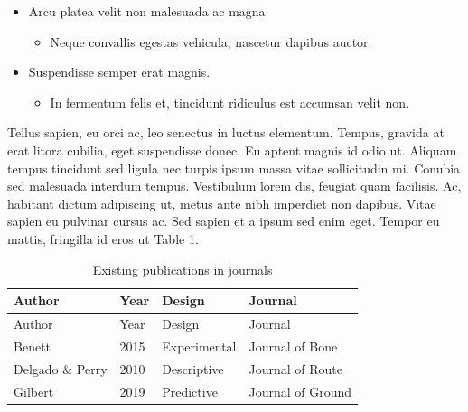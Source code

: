 \documentclass[
  12,
]{article}
\providecommand{\tightlist}{%
  \setlength{\itemsep}{0pt}\setlength{\parskip}{0pt}}
\begin{document}
\begin{itemize}
\tightlist
\item
  Arcu platea velit non malesuada ac magna.

  \begin{itemize}
  \tightlist
  \item
    Neque convallis egestas vehicula, nascetur dapibus auctor.\\
  \end{itemize}
\item
  Suspendisse semper erat magnis.

  \begin{itemize}
  \tightlist
  \item
    In fermentum felis et, tincidunt ridiculus est accumsan velit non.
  \end{itemize}
\end{itemize}

Tellus sapien, eu orci ac, leo senectus in luctus elementum. Tempus,
gravida at erat litora cubilia, eget suspendisse donec. Eu aptent magnis
id odio ut. Aliquam tempus tincidunt sed ligula nec turpis ipsum massa
vitae sollicitudin mi. Conubia sed malesuada interdum tempus. Vestibulum
lorem dis, feugiat quam facilisis. Ac, habitant dictum adipiscing ut,
metus ante nibh imperdiet non dapibus. Vitae sapien eu pulvinar cursus
ac. Sed sapien et a ipsum sed enim eget. Tempor eu mattis, fringilla id
eros ut Table 1.

\begin{longtable}[]{@{}llll@{}}
\caption{Existing publications in journals
\label{markdown_table}}\tabularnewline
\toprule()
Author & Year & Design & Journal \\
\midrule()
\endfirsthead
\toprule()
Author & Year & Design & Journal \\
\midrule()
\endhead
Benett & 2015 & Experimental & Journal of Bone \\
Delgado \& Perry & 2010 & Descriptive & Journal of Route \\
Gilbert & 2019 & Predictive & Journal of Ground \\
\bottomrule()
\end{longtable}
\end{document}
